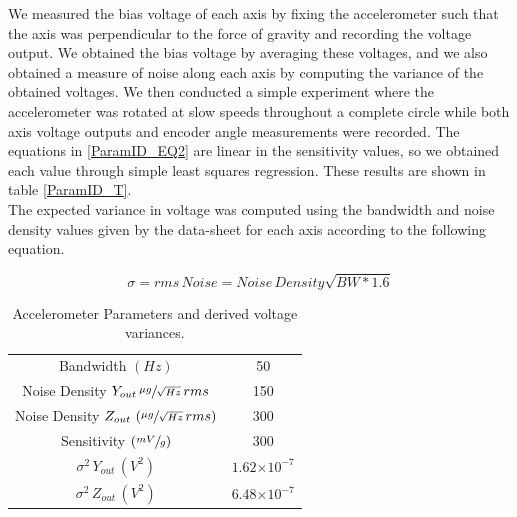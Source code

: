 \documentclass{article}
\theoremstyle{plain}
\theoremstyle{definition}
\theoremstyle{remark}
\providecommand{\e}[1]{\ensuremath{\times 10^{#1}}}
\begin{document}
We measured the bias voltage of each axis by fixing the accelerometer such that the axis was perpendicular to the force of gravity and recording the voltage output.  We obtained the bias voltage by averaging these voltages, and we also obtained a measure of noise along each axis by computing the variance of the obtained voltages.  We then conducted a simple experiment where the accelerometer was rotated at slow speeds throughout a complete circle while both axis voltage outputs and encoder angle measurements were recorded.  The equations in \ref{ParamID_EQ2} are linear in the sensitivity values, so we obtained each value through simple least squares regression.  These results are shown in table \ref{ParamID_T}. \\

The expected variance in voltage was computed using the bandwidth and noise density values given by the data-sheet for each axis according to the following equation.


$$\sigma = rms \, Noise = Noise \, Density \sqrt{BW * 1.6} $$

\begin{table}
\begin{center}
	\begin{tabular}{|c|c|}
		\hline
		Bandwidth $(Hz)$ & 50 \\ 
		Noise Density $Y_{out} \, \sfrac{\mu g}{\sqrt{Hz}} \, rms$ & 150 \\ 
		Noise Density $Z_{out} \, \left(\sfrac{\mu g}{\sqrt{Hz}} \, rms\right)$ & 300 \\ 
		Sensitivity $\left( \sfrac{mV}{g} \right)$ & 300 \\  
		$\sigma^2 \,Y_{out} \, (V^2)$ & $1.62 \e{-7}$ \\ 
		$\sigma^2 \,Z_{out} \, (V^2)$ & $6.48 \e{-7}$ \\[0.1cm] \hline
		
	\end{tabular}
\caption{Accelerometer Parameters and derived voltage variances.}
\label{ParamID_AccelT}
\end{center}
\end{table}
\end{document}
